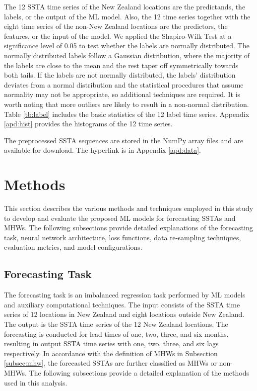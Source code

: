 \documentclass[11pt, a4paper]{article}
\begin{document}
The 12 SSTA time series of the New Zealand locations are the predictands, the labels, or the output of the ML model. Also, the 12 time series together with the eight time series of the non-New Zealand locations are the predictors, the features, or the input of the model. We applied the Shapiro-Wilk Test \citep{shapiro1965analysis} at a significance level of 0.05 to test whether the labels are normally distributed. The normally distributed labels follow a Gaussian distribution, where the majority of the labels are close to the mean and the rest taper off symmetrically towards both tails. If the labels are not normally distributed, the labels' distribution deviates from a normal distribution and the statistical procedures that assume normality may not be appropriate, so additional techniques are required. It is worth noting that more outliers are likely to result in a non-normal distribution. Table \ref{tb:label} includes the basic statistics of the 12 label time series. Appendix \ref{apd:hist} provides the histograms of the 12 time series.

The preprocessed SSTA sequences are stored in the NumPy array files and are available for download. The hyperlink is in Appendix \ref{apd:data}.

\section{Methods}

This section describes the various methods and techniques employed in this study to develop and evaluate the proposed ML models for forecasting SSTAs and MHWs. The following subsections provide detailed explanations of the forecasting task, neural network architecture, loss functions, data re-sampling techniques, evaluation metrics, and model configurations.

\subsection{Forecasting Task}

The forecasting task is an imbalanced regression task performed by ML models and auxiliary computational techniques. The input consists of the SSTA time series of 12 locations in New Zealand and eight locations outside New Zealand. The output is the SSTA time series of the 12 New Zealand locations. The forecasting is conducted for lead times of one, two, three, and six months, resulting in output SSTA time series with one, two, three, and six lags respectively. In accordance with the definition of MHWs in Subsection \ref{subsec:mhw}, the forecasted SSTAs are further classified as MHWs or non-MHWs. The following subsections provide a detailed explanation of the methods used in this analysis.
\end{document}
